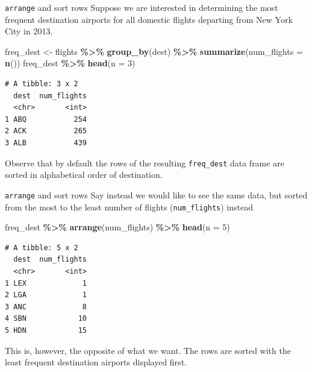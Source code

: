 \documentclass[
  ignorenonframetext,
]{beamer}
\newenvironment{Shaded}{\begin{snugshade}}{\end{snugshade}}
\newcommand{\AttributeTok}[1]{\textcolor[rgb]{0.13,0.29,0.53}{#1}}
\newcommand{\DecValTok}[1]{\textcolor[rgb]{0.00,0.00,0.81}{#1}}
\newcommand{\FunctionTok}[1]{\textcolor[rgb]{0.13,0.29,0.53}{\textbf{#1}}}
\newcommand{\NormalTok}[1]{#1}
\newcommand{\OtherTok}[1]{\textcolor[rgb]{0.56,0.35,0.01}{#1}}
\newcommand{\SpecialCharTok}[1]{\textcolor[rgb]{0.81,0.36,0.00}{\textbf{#1}}}
\begin{document}
\begin{frame}[fragile]{\texttt{arrange} and sort rows}
\protect\hypertarget{arrange-and-sort-rows-1}{}
Suppose we are interested in determining the most frequent destination
airports for all domestic flights departing from New York City in 2013.

\normalsize

\begin{Shaded}
\begin{Highlighting}[]
\NormalTok{freq\_dest }\OtherTok{\textless{}{-}}\NormalTok{ flights }\SpecialCharTok{\%\textgreater{}\%} 
  \FunctionTok{group\_by}\NormalTok{(dest) }\SpecialCharTok{\%\textgreater{}\%} 
  \FunctionTok{summarize}\NormalTok{(}\AttributeTok{num\_flights =} \FunctionTok{n}\NormalTok{())}
\NormalTok{freq\_dest }\SpecialCharTok{\%\textgreater{}\%} \FunctionTok{head}\NormalTok{(}\AttributeTok{n =} \DecValTok{3}\NormalTok{)}
\end{Highlighting}
\end{Shaded}

\begin{verbatim}
# A tibble: 3 x 2
  dest  num_flights
  <chr>       <int>
1 ABQ           254
2 ACK           265
3 ALB           439
\end{verbatim}

\normalsize

Observe that by default the rows of the resulting \texttt{freq\_dest}
data frame are sorted in alphabetical order of destination.
\end{frame}

\begin{frame}[fragile]{\texttt{arrange} and sort rows}
\protect\hypertarget{arrange-and-sort-rows-2}{}
Say instead we would like to see the same data, but sorted from the most
to the least number of flights (\texttt{num\_flights}) instead

\normalsize

\begin{Shaded}
\begin{Highlighting}[]
\NormalTok{freq\_dest }\SpecialCharTok{\%\textgreater{}\%} 
  \FunctionTok{arrange}\NormalTok{(num\_flights) }\SpecialCharTok{\%\textgreater{}\%} 
  \FunctionTok{head}\NormalTok{(}\AttributeTok{n =} \DecValTok{5}\NormalTok{)}
\end{Highlighting}
\end{Shaded}

\begin{verbatim}
# A tibble: 5 x 2
  dest  num_flights
  <chr>       <int>
1 LEX             1
2 LGA             1
3 ANC             8
4 SBN            10
5 HDN            15
\end{verbatim}

\normalsize

This is, however, the opposite of what we want. The rows are sorted with
the least frequent destination airports displayed first.
\end{frame}
\end{document}
